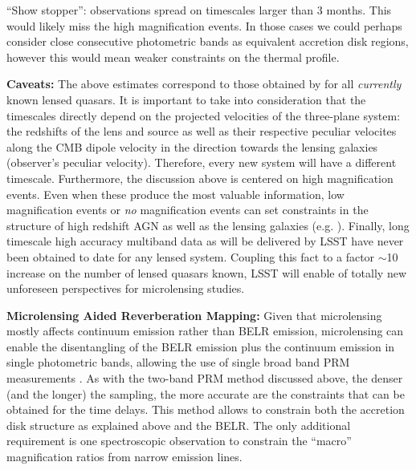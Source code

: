 ``Show stopper'': observations spread on timescales larger than 3 months.
This would likely miss the high magnification events. In those cases
we could perhaps consider close consecutive photometric bands as
equivalent accretion disk regions, however this would mean weaker
constraints on the thermal profile.

{\bf Caveats:} The above estimates correspond to those obtained by \citet{MosqueraandKochanek2011} for all \emph{currently} known lensed quasars. It is important to take into consideration that the timescales directly depend on the projected velocities of the three-plane system: the redshifts of the lens and source as well as their respective peculiar velocites along the CMB dipole velocity in the direction towards the lensing galaxies (observer's peculiar velocity). Therefore, every new system will have a different timescale. Furthermore, the discussion above is centered on high magnification events. Even when these produce the most valuable information, low magnification events or \emph{no} magnification events can set constraints in the structure of high redshift AGN as well as the lensing galaxies (e.g. \citealt{gilmerino2005}). Finally, long timescale high accuracy multiband data as will be delivered by LSST have never been obtained to date for any lensed system. Coupling this fact to a factor $\sim$10 increase on the number of lensed quasars known, LSST will enable of totally new unforeseen perspectives for microlensing studies.

%

{\bf Microlensing Aided Reverberation Mapping:} Given that
microlensing mostly affects continuum emission rather than BELR emission, microlensing can enable the disentangling of the BELR emission plus the
continuum emission in single photometric bands, allowing the use of
single broad band PRM measurements \citep{SluseandTewes2014}. As with
the two-band PRM method discussed above, the denser (and the longer)
the sampling, the more accurate are the constraints that can be
obtained for the time delays. This method allows to constrain both the accretion disk structure as explained above and the BELR. The only additional requirement is one spectroscopic observation to constrain the ``macro'' magnification ratios from narrow emission lines.


